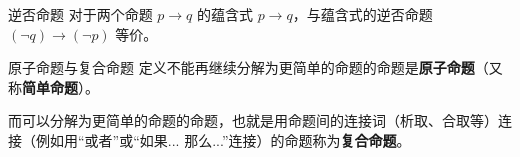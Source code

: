 \begin{theorem}{逆否命题}
对于两个命题 $p \rightarrow q$ 的蕴含式 $p \rightarrow q$，与蕴含式的逆否命题 $(\neg q) \rightarrow (\neg p)$ 等价。
\end{theorem}

\begin{definition}{原子命题与复合命题}
定义不能再继续分解为更简单的命题的命题是\textbf{原子命题}（又称\textbf{简单命题}）。

而可以分解为更简单的命题的命题，也就是用命题间的连接词（析取、合取等）连接（例如用“或者”或“如果... 那么...”连接）的命题称为\textbf{复合命题}。
\end{definition}
